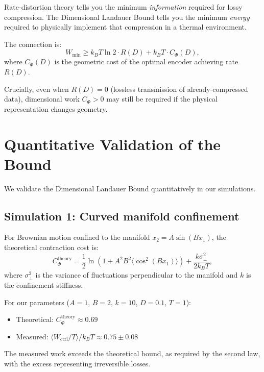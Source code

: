 \documentclass[aps,prx,twocolumn,superscriptaddress,floatfix]{revtex4-2}
\begin{document}
Rate-distortion theory tells you the minimum \emph{information} required for lossy compression. The Dimensional Landauer Bound tells you the minimum \emph{energy} required to physically implement that compression in a thermal environment.

The connection is:
\begin{equation}
W_\mathrm{min} \geq k_B T \ln 2 \cdot R(D) + k_B T \cdot C_\Phi(D),
\end{equation}
where $C_\Phi(D)$ is the geometric cost of the optimal encoder achieving rate $R(D)$.

Crucially, even when $R(D) = 0$ (lossless transmission of already-compressed data), dimensional work $C_\Phi > 0$ may still be required if the physical representation changes geometry.

\section{Quantitative Validation of the Bound}
\label{app:validation}

We validate the Dimensional Landauer Bound quantitatively in our simulations.

\subsection{Simulation 1: Curved manifold confinement}

For Brownian motion confined to the manifold $x_2 = A\sin(Bx_1)$, the theoretical contraction cost is:
\begin{equation}
C_\Phi^\mathrm{theory} = \frac{1}{2}\ln(1 + A^2 B^2 \langle\cos^2(Bx_1)\rangle) + \frac{k\sigma_\perp^2}{2k_B T},
\end{equation}
where $\sigma_\perp^2$ is the variance of fluctuations perpendicular to the manifold and $k$ is the confinement stiffness.

For our parameters ($A=1$, $B=2$, $k=10$, $D=0.1$, $T=1$):
\begin{itemize}
\item Theoretical: $C_\Phi^\mathrm{theory} \approx 0.69$
\item Measured: $\langle W_\mathrm{ctrl}/T \rangle / k_B T \approx 0.75 \pm 0.08$
\end{itemize}

The measured work exceeds the theoretical bound, as required by the second law, with the excess representing irreversible losses.
\end{document}
